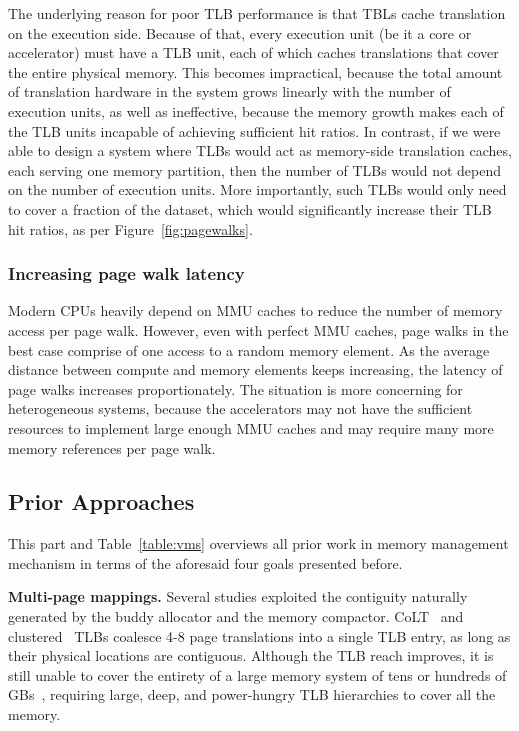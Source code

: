 The underlying reason for poor TLB performance is that TBLs cache translation on the execution side. Because of that, every execution unit (be it a core or accelerator) must have a TLB unit, each of which caches translations that cover the entire physical memory. This becomes impractical, because the total amount of translation hardware in the system grows linearly with the number of execution units, as well as ineffective, because the memory growth makes each of the TLB units incapable of achieving sufficient hit ratios. In contrast, if we were able to design a system where TLBs would act as memory-side translation caches, each serving one memory partition, then the number of TLBs would not depend on the number of execution units. More importantly, such TLBs would only need to cover a fraction of the dataset, which would significantly increase their TLB hit ratios, as per Figure~\ref{fig:pagewalks}.

\subsubsection{Increasing page walk latency}
Modern CPUs heavily depend on MMU caches to reduce the number of memory access per page walk. However, even with perfect MMU caches, page walks in the best case comprise of one access to a random memory element. As the average distance between compute and memory elements keeps increasing, the latency of page walks increases proportionately. The situation is more concerning for heterogeneous systems, because the accelerators may not have the sufficient resources to implement large enough MMU caches and may require many more memory references per page walk. 

\subsection{Prior Approaches}

This part and Table~\ref{table:vms} overviews all prior work in memory management mechanism in terms of the aforesaid four goals presented before.

\noindent\textbf{Multi-page mappings.} Several studies exploited
the contiguity naturally generated by the buddy allocator and the
memory compactor. CoLT~\cite{pham:colt} and clustered~\cite{pham:increasing} TLBs coalesce 4-8 page translations into a single TLB entry, as long as their physical locations are contiguous. Although the TLB reach improves, it is still unable to cover the entirety of a large memory system of tens or hundreds of GBs~\cite{gandhi:range}, requiring large, deep, and power-hungry TLB hierarchies to cover all the memory.


